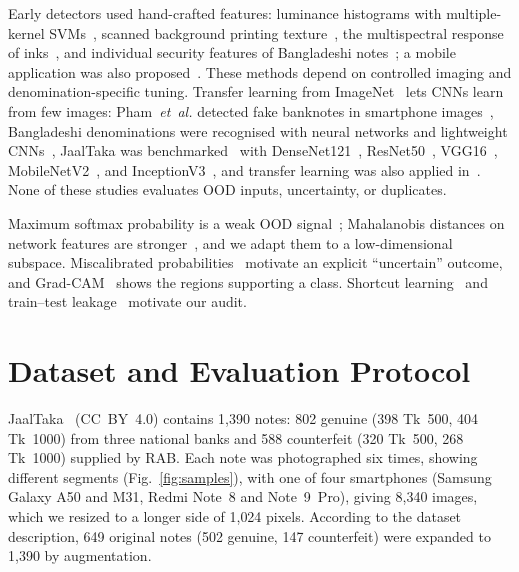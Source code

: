 \documentclass[journal,onecolumn]{IEEEtran}
\begin{document}
Early detectors used hand-crafted features: luminance histograms with multiple-kernel
SVMs~\cite{yeh2011}, scanned background printing texture~\cite{berenguel2016}, the
multispectral response of inks~\cite{baek2018}, and individual security features of
Bangladeshi notes~\cite{uddin2016}; a mobile application was also
proposed~\cite{dittimi2018}. These methods depend on controlled imaging and
denomination-specific tuning. Transfer learning from
ImageNet~\cite{deng2009imagenet,yosinski2014transferable} lets CNNs learn from few
images: Pham~\textit{et~al.} detected fake banknotes in smartphone
images~\cite{pham2020,pham2022}, Bangladeshi denominations were recognised with neural
networks and lightweight CNNs~\cite{jahangir2007,linkon2020}, JaalTaka was
benchmarked~\cite{piyas2025jaaltaka} with DenseNet121~\cite{huang2017densenet},
ResNet50~\cite{he2016resnet}, VGG16~\cite{simonyan2015vgg},
MobileNetV2~\cite{sandler2018mobilenetv2}, and InceptionV3~\cite{szegedy2016inception},
and transfer learning was also applied in~\cite{tabassum2025}. None of these studies
evaluates OOD inputs, uncertainty, or duplicates.

Maximum softmax probability is a weak OOD signal~\cite{hendrycks2017baseline};
Mahalanobis distances on network features are stronger~\cite{lee2018mahalanobis}, and
we adapt them to a low-dimensional subspace. Miscalibrated
probabilities~\cite{guo2017calibration} motivate an explicit ``uncertain'' outcome, and
Grad-CAM~\cite{selvaraju2017gradcam} shows the regions supporting a class. Shortcut
learning~\cite{geirhos2020shortcut} and train--test leakage~\cite{kapoor2023leakage}
motivate our audit.

\section{Dataset and Evaluation Protocol}
\label{sec:data}

JaalTaka~\cite{piyas2025jaaltaka,jaaltaka_data} (CC~BY~4.0) contains 1{,}390 notes:
802 genuine (398 Tk~500, 404 Tk~1000) from three national banks and 588 counterfeit
(320 Tk~500, 268 Tk~1000) supplied by RAB. Each note was photographed six times, showing
different segments (Fig.~\ref{fig:samples}), with one of four smartphones (Samsung Galaxy
A50 and M31, Redmi Note~8 and Note~9~Pro), giving 8{,}340 images, which we resized to a
longer side of 1{,}024 pixels. According to the dataset description, 649 original notes
(502 genuine, 147 counterfeit) were expanded to 1{,}390 by augmentation.
\end{document}
